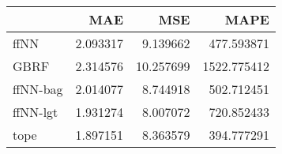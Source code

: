 \begin{tabular}{lrrr}
\toprule
{} &       MAE &        MSE &         MAPE \\
\midrule
ffNN     &  2.093317 &   9.139662 &   477.593871 \\
GBRF     &  2.314576 &  10.257699 &  1522.775412 \\
ffNN-bag &  2.014077 &   8.744918 &   502.712451 \\
ffNN-lgt &  1.931274 &   8.007072 &   720.852433 \\
tope     &  1.897151 &   8.363579 &   394.777291 \\
\bottomrule
\end{tabular}
